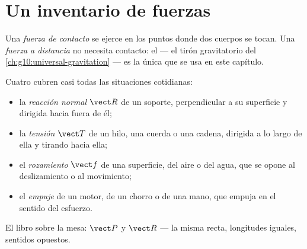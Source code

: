 \section{Un inventario de fuerzas}

\begin{definition}\label{def:g10:inertia:contact}
Una \emph{fuerza de contacto} se ejerce en los
puntos donde dos cuerpos se tocan. Una \emph{fuerza a
distancia} no necesita contacto: el  ---
el tirón gravitatorio del \cref{ch:g10:universal-gravitation} --- es la
única que se usa en este capítulo.
\end{definition}

\begin{definition}\label{def:g10:inertia:inventory}
Cuatro  cubren casi todas las situaciones
cotidianas:
\begin{itemize}
  \item la \emph{reacción normal} $\vect R$ de un
        soporte, perpendicular a su superficie y dirigida hacia fuera de
        él;
  \item la \emph{tensión} $\vect T$ de un hilo, una
        cuerda o una cadena, dirigida a lo largo de ella y tirando hacia
        ella;
  \item el \emph{rozamiento} $\vect f$ de una
        superficie, del aire o del agua, que se opone al deslizamiento o
        al movimiento;
  \item el \emph{empuje} de un motor, de un chorro o de
        una mano, que empuja en el sentido del esfuerzo.
\end{itemize}
\end{definition}

\begin{omfigure}

{\small El libro sobre la mesa:  $\vect P$ y 
$\vect R$ --- la misma recta, longitudes iguales, sentidos opuestos.}
\end{omfigure}


